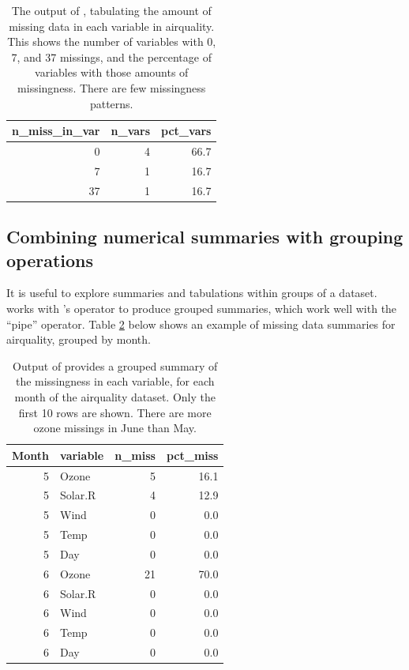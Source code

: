 \documentclass[
]{jss}
\begin{document}
\begin{CodeChunk}
\begin{table}

\caption{\label{tab:miss-var-table}The output of , tabulating the amount of missing data in each variable in airquality. This shows the number of variables with 0, 7, and 37 missings, and the percentage of variables with those amounts of missingness. There are few missingness patterns.}
\centering
\begin{tabular}[t]{r|r|r}
\hline
n\_miss\_in\_var & n\_vars & pct\_vars\\
\hline
0 & 4 & 66.7\\
\hline
7 & 1 & 16.7\\
\hline
37 & 1 & 16.7\\
\hline
\end{tabular}
\end{table}

\end{CodeChunk}

\hypertarget{num-sum-w-group}{%
\subsection{Combining numerical summaries with grouping operations}\label{num-sum-w-group}}

It is useful to explore summaries and tabulations within groups of a dataset.  works with 's  operator to produce grouped summaries, which work well with the ``pipe'' operator. Table \ref{tab:group-miss-var-summary} below shows an example of missing data summaries for airquality, grouped by month.

\begin{CodeChunk}
\begin{table}

\caption{\label{tab:group-miss-var-summary}Output of  provides a grouped summary of the missingness in each variable, for each month of the airquality dataset. Only the first 10 rows are shown. There are more ozone missings in June than May.}
\centering
\begin{tabular}[t]{r|l|r|r}
\hline
Month & variable & n\_miss & pct\_miss\\
\hline
5 & Ozone & 5 & 16.1\\
\hline
5 & Solar.R & 4 & 12.9\\
\hline
5 & Wind & 0 & 0.0\\
\hline
5 & Temp & 0 & 0.0\\
\hline
5 & Day & 0 & 0.0\\
\hline
6 & Ozone & 21 & 70.0\\
\hline
6 & Solar.R & 0 & 0.0\\
\hline
6 & Wind & 0 & 0.0\\
\hline
6 & Temp & 0 & 0.0\\
\hline
6 & Day & 0 & 0.0\\
\hline
\end{tabular}
\end{table}

\end{CodeChunk}
\end{document}
